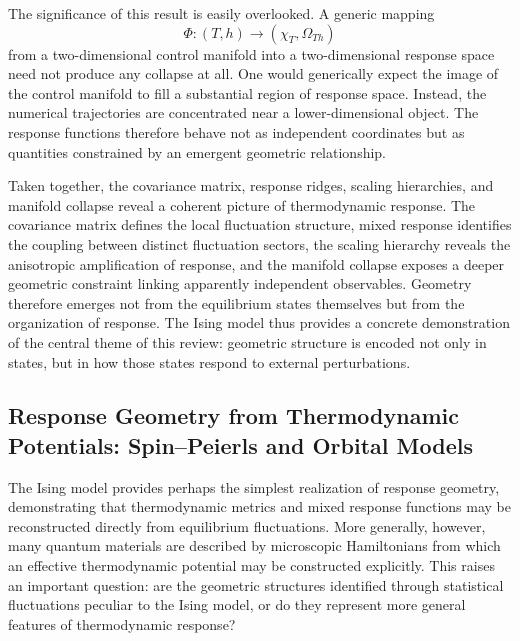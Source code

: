 The significance of this result is easily overlooked. A generic
mapping
\begin{equation}
\Phi :(T,h)
\longrightarrow (\chi_T,\Omega_{Th})
\end{equation}
from a two-dimensional control manifold into a two-dimensional
response space need not produce any collapse at all. One would
generically expect the image of the control manifold to fill a
substantial region of response space. Instead, the numerical
trajectories are concentrated near a lower-dimensional object.
The response functions therefore behave not as independent
coordinates but as quantities constrained by an emergent
geometric relationship.

Taken together, the covariance matrix, response ridges,
scaling hierarchies, and manifold collapse reveal a coherent
picture of thermodynamic response. The covariance matrix
defines the local fluctuation structure, mixed response
identifies the coupling between distinct fluctuation sectors,
the scaling hierarchy reveals the anisotropic amplification of
response, and the manifold collapse exposes a deeper geometric
constraint linking apparently independent observables.
Geometry therefore emerges not from the equilibrium states
themselves but from the organization of response. The Ising
model thus provides a concrete demonstration of the central
theme of this review: geometric structure is encoded not only
in states, but in how those states respond to external
perturbations.



\subsection{Response Geometry from Thermodynamic Potentials: Spin–Peierls and Orbital Models}

The Ising model provides perhaps the simplest realization of
response geometry, demonstrating that thermodynamic metrics and
mixed response functions may be reconstructed directly from
equilibrium fluctuations. More generally, however, many quantum
materials are described by microscopic Hamiltonians from which an
effective thermodynamic potential may be constructed explicitly.
This raises an important question: are the geometric structures
identified through statistical fluctuations peculiar to the
Ising model, or do they represent more general features of
thermodynamic response?

